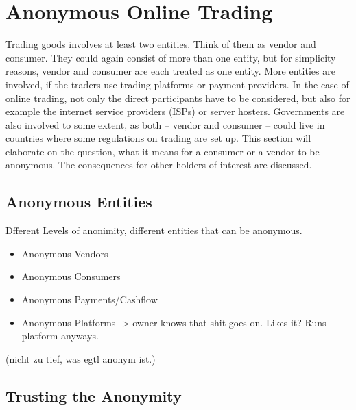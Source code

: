 \section{Anonymous Online Trading}


Trading goods involves at least two entities. Think of them as vendor and consumer. They could again consist of more than one entity, but for simplicity reasons, vendor and consumer are each treated as one entity. More entities are involved, if the traders use trading platforms or payment providers. In the case of online trading, not only the direct participants have to be considered, but also for example the internet service providers (ISPs) or server hosters. Governments are also involved to some extent, as both -- vendor and consumer -- could live in countries where some regulations on trading are set up.
This section will elaborate on the question, what it means for a consumer or a vendor to be anonymous. The consequences for other holders of interest are discussed.

\subsection{Anonymous Entities}

Dfferent Levels of anonimity, different entities that can be anonymous.
\begin{itemize}
    \item Anonymous Vendors
    \item Anonymous Consumers
    \item Anonymous Payments/Cashflow
    \item Anonymous Platforms -> owner knows that shit goes on. Likes it? Runs platform anyways.
\end{itemize}
(nicht zu tief, was egtl anonym ist.)

\subsection{Trusting the Anonymity}



